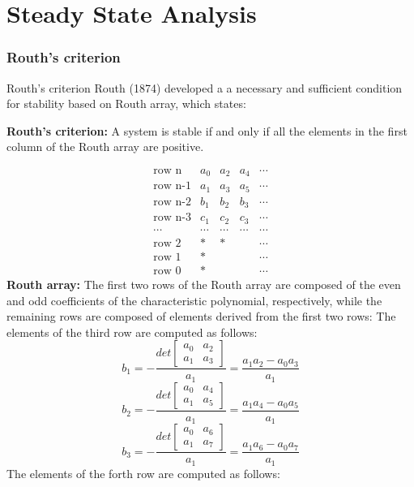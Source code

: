 \documentclass{beamer}
\begin{document}
\section{Steady State Analysis}
\begin{frame}[allowframebreaks]
\frametitle{Routh's criterion}
\begin{block}{Routh's criterion}
Routh (1874) developed a a necessary and sufficient condition for stability
based on Routh array, which states:
\end{block}
\medskip
{\bf Routh's criterion: } 
A system is stable if and only if all the elements in the first column of the
Routh array are positive.
\medskip

\[ \begin{array}{lllll}
\mbox{row n}   & a_0 & a_2 & a_4 & \cdots \\
\mbox{row n-1} & a_1 & a_3 & a_5 & \cdots \\
\mbox{row n-2} & b_1 & b_2 & b_3 & \cdots \\
\mbox{row n-3} & c_1 & c_2 & c_3 & \cdots \\
\cdots & \cdots & \cdots & \cdots & \cdots \\
\mbox{row 2} & * & * &  & \cdots \\
\mbox{row 1} & * &   &  & \cdots \\
\mbox{row 0} & * &   &  & \cdots \end{array} \]
{\bf Routh array: } The first two rows of the Routh array are composed of
the even and odd coefficients of the characteristic polynomial, respectively,
while the remaining rows are composed of elements derived from the first
two rows:
\medskip
The elements of the third row are computed as follows:
\medskip
\[ b_1=-\frac{det\left[\begin{array}{cc}a_0&a_2\\a_1&a_3\end{array}\right]}{a_1}
=\frac{a_1a_2-a_0a_3}{a_1} \]
\[ b_2=-\frac{det\left[\begin{array}{cc}a_0&a_4\\a_1&a_5\end{array}\right]}{a_1}
=\frac{a_1a_4-a_0a_5}{a_1} \]
\[ b_3=-\frac{det\left[\begin{array}{cc}a_0&a_6\\a_1&a_7\end{array}\right]}{a_1}
=\frac{a_1a_6-a_0a_7}{a_1} \]
The elements of the forth row are computed as follows:

\end{frame}
\end{document}
